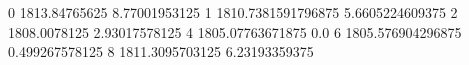 0 1813.84765625 8.77001953125
1 1810.7381591796875 5.6605224609375
2 1808.0078125 2.93017578125
4 1805.07763671875 0.0
6 1805.576904296875 0.499267578125
8 1811.3095703125 6.23193359375
